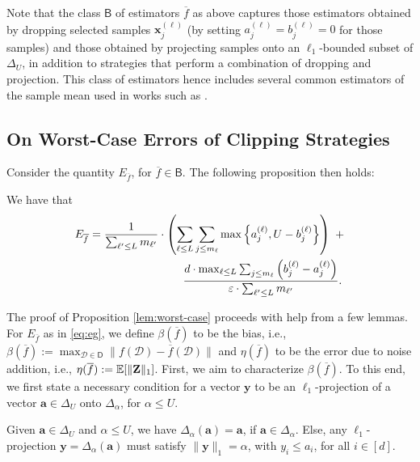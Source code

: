 Note that the class $\mathsf{B}$ of estimators $\overline{f}$ as above  captures those estimators obtained by dropping selected samples $\mathbf{x}_j^{(\ell)}$ (by setting $a_j^{(\ell)}= b_j^{(\ell)} = 0$ for those samples) and those obtained by projecting samples onto an $\ell_1$-bounded subset of $\Delta_U$, in addition to strategies that perform a combination of dropping and projection. This class of estimators hence includes several common estimators of the sample mean used in works such as \cite{userlevel,dp_preprint,tit-preprint}.


\subsection{On Worst-Case Errors of Clipping Strategies}
\label{sec:worst-case}
Consider the quantity $E_{\overline{f}}$, for $\overline{f}\in \mathsf{B}$. The following proposition then holds:
\begin{proposition}
	\label{lem:worst-case}
	We have that
	\begin{align*}
		E_{\overline{f}} \notag&= \frac{1}{\sum_{\ell'\leq L} m_{\ell'}}\cdot \left(\sum_{\ell\leq L}\sum_{j\leq m_\ell} \max\left\{a_j^{(\ell)},U-b_j^{(\ell)}\right\}\right)\ + \notag\\
		&\ \ \  \ \ \ \ \ \ \  \ \ \ \ \ \ \ \  \ \ \ \  \ \ \ \frac{d\cdot\max_{\ell\leq L} \sum_{j\leq m_\ell} \left(b_j^{(\ell)}-a_j^{(\ell)}\right)}{\varepsilon\cdot \sum_{\ell'\leq L} m_{\ell'}}.
	\end{align*}
\end{proposition}
The proof of Proposition \ref{lem:worst-case} proceeds with help from a few lemmas. For $E_{\overline{f}}$ as in \eqref{eq:eg}, we define $\beta(\overline{f})$ to be the bias, i.e., $\beta(\overline{f}):= \max_{\mathcal{D}\in \mathsf{D}} \big \lVert f(\mathcal{D}) - \overline{f}(\mathcal{D}) \big\rVert$ and $\eta(\overline{f})$ to be the error due to noise addition, i.e., $\eta(\overline{f}):= \mathbb{E}[\lVert\mathbf{\mathbf{Z}}\rVert_1]$. First, we aim to characterize $\beta(\overline{f})$. To this end, we first state a necessary condition for a vector $\mathbf{y}$ to be an $\ell_1$-projection of a vector $\mathbf{a}\in \Delta_U$ onto $\Delta_\alpha$, for $ \alpha\leq U$. 
\begin{lemma}
	\label{lem:proj1}
	Given $\mathbf{a}\in \Delta_U$ and $\alpha\leq U$, we have $\Delta_\alpha(\mathbf{a}) = \mathbf{a}$, if $\mathbf{a}\in \Delta_{\alpha}$. Else, any $\ell_1$-projection $\mathbf{y} = \Delta_\alpha(\mathbf{a})$ must satisfy $\lVert \mathbf{y}\rVert_1 = \alpha$, with $y_i\leq a_i$, for all $i\in [d]$.
\end{lemma}
